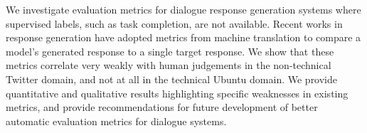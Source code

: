 We investigate evaluation metrics for dialogue response generation systems where supervised labels, such as task completion, are not available. Recent works in response generation have adopted metrics from machine translation to compare a model's generated response to a single target response. We show that these metrics correlate very weakly with human judgements in the non-technical Twitter domain, and not at all in the technical Ubuntu domain. We provide quantitative and qualitative results highlighting specific weaknesses in existing metrics, and provide recommendations for future development of better automatic evaluation metrics for dialogue systems.
